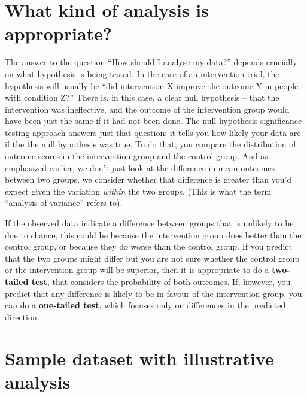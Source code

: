 \documentclass{krantz}
\begin{document}
\hypertarget{what-kind-of-analysis-is-appropriate}{%
\section{What kind of analysis is appropriate?}\label{what-kind-of-analysis-is-appropriate}}

The answer to the question ``How should I analyse my data?'' depends crucially on what hypothesis is being tested. In the case of an intervention trial, the hypothesis will usually be ``did intervention X improve the outcome Y in people with condition Z?'' There is, in this case, a clear null hypothesis -- that the intervention was ineffective, and the outcome of the intervention group would have been just the same if it had not been done. The null hypothesis significance testing approach answers just that question: it tells you how likely your data are if the the null hypothesis was true. To do that, you compare the distribution of outcome scores in the intervention group and the control group. And as emphasized earlier, we don't just look at the difference in mean outcomes between two groups, we consider whether that difference is greater than you'd expect given the variation \emph{within} the two groups. (This is what the term ``analysis of variance'' refers to).

If the observed data indicate a difference between groups that is unlikely to be due to chance, this could be because the intervention group does better than the control group, or because they do worse than the control group. If you predict that the two groups might differ but you are not sure whether the control group or the intervention group will be superior, then it is appropriate to do a \textbf{two-tailed test}, that considers the probability of both outcomes. If, however, you predict that any difference is likely to be in favour of the intervention group, you can do a \textbf{one-tailed test}, which focuses only on differences in the predicted direction.

\hypertarget{sample-dataset-with-illustrative-analysis}{%
\section{Sample dataset with illustrative analysis}\label{sample-dataset-with-illustrative-analysis}}
\end{document}
